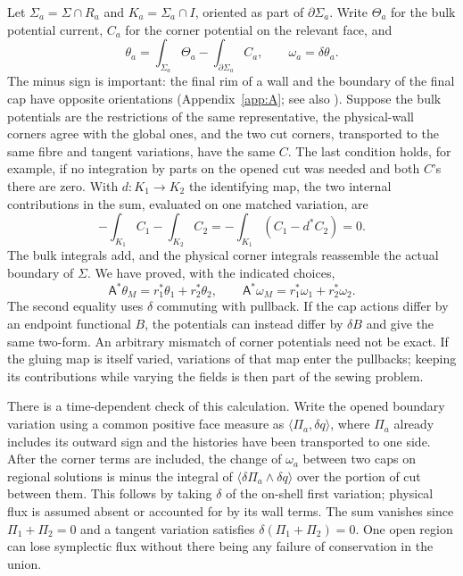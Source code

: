 Let $\Sigma_a=\Sigma\cap R_a$ and $K_a=\Sigma_a\cap I$, oriented as part of $\partial\Sigma_a$. Write $\Theta_a$ for the bulk potential current, $C_a$ for the corner potential on the relevant face, and
\[
 \theta_a=\int_{\Sigma_a}\Theta_a-\int_{\partial\Sigma_a} C_a,
 \qquad \omega_a=\delta\theta_a .
\]
The minus sign is important: the final rim of a wall and the boundary of the final cap have opposite orientations (Appendix~\ref{app:A}; see also \cite{HW}). Suppose the bulk potentials are the restrictions of the same representative, the physical-wall corners agree with the global ones, and the two cut corners, transported to the same fibre and tangent variations, have the same $C$. The last condition holds, for example, if no integration by parts on the opened cut was needed and both $C$'s there are zero. With $d:K_1\to K_2$ the identifying map, the two internal contributions in the sum, evaluated on one matched variation, are
\[
 -\int_{K_1} C_1-\int_{K_2} C_2
        =-\int_{K_1}(C_1-d^*C_2)=0 .
\]
The bulk integrals add, and the physical corner integrals reassemble the actual boundary of $\Sigma$. We have proved, with the indicated choices,
\begin{equation}
 \mathsf A^*\theta_M=r_1^*\theta_1+r_2^*\theta_2,
 \qquad \mathsf A^*\omega_M=r_1^*\omega_1+r_2^*\omega_2 .
 \label{eq:09-sewn-form}
\end{equation}
The second equality uses $\delta$ commuting with pullback. If the cap actions differ by an endpoint functional $B$, the potentials can instead differ by $\delta B$ and give the same two-form. An arbitrary mismatch of corner potentials need not be exact. If the gluing map is itself varied, variations of that map enter the pullbacks; keeping its contributions while varying the fields is then part of the sewing problem.

There is a time-dependent check of this calculation. Write the opened boundary variation using a common positive face measure as $\langle\Pi_a,\delta q\rangle$, where $\Pi_a$ already includes its outward sign and the histories have been transported to one side. After the corner terms are included, the change of $\omega_a$ between two caps on regional solutions is minus the integral of $\langle\delta\Pi_a\wedge\delta q\rangle$ over the portion of cut between them. This follows by taking $\delta$ of the on-shell first variation; physical flux is assumed absent or accounted for by its wall terms. The sum vanishes since $\Pi_1+\Pi_2=0$ and a tangent variation satisfies $\delta(\Pi_1+\Pi_2)=0$. One open region can lose symplectic flux without there being any failure of conservation in the union.

